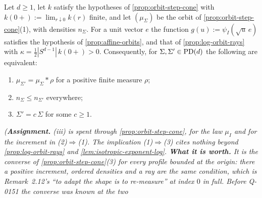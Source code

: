 \begin{proposition}
\label{prop:bounded-profile-rays}
\leanok
Let $d \ge 1$, let $k$ satisfy the hypotheses of \ref{prop:orbit-step-cone} with
$k(0{+}) := \lim_{r\downarrow0}k(r)$ finite, and let $(\mu_\Sigma)$ be the orbit of
\ref{prop:orbit-step-cone}(1), with \Levy{} densities $n_\Sigma$. For a unit vector $e$ the function
$g(u) := \psi_I(\sqrt u\,e)$ satisfies the hypothesis of \ref{prop:affine-orbits}, and that of
\ref{prop:log-orbit-rays} with $\kappa = \tfrac12|S^{d-1}|\,k(0{+}) > 0$. Consequently, for
$\Sigma, \Sigma' \in \mathrm{PD}(d)$ the following are equivalent:
\begin{enumerate}
\item $\mu_{\Sigma'} = \mu_\Sigma * \rho$ for a positive finite measure $\rho$;
\item $n_\Sigma \le n_{\Sigma'}$ everywhere;
\item $\Sigma' = c\,\Sigma$ for some $c \ge 1$.
\end{enumerate}
\statusA\quad{}\quad\emph{(\textbf{Assignment.} (iii) is spent through
\ref{prop:orbit-step-cone}, for the law $\mu_I$ and for the increment in (2)$\Rightarrow$(1). The
implication (1)$\Rightarrow$(3) cites nothing beyond \ref{prop:log-orbit-rays} and
\ref{lem:isotropic-exponent-log}. \textbf{What it is worth.} It is the converse of
\ref{prop:orbit-step-cone}(3) for every profile bounded at the origin: there a positive increment,
ordered \Levy{} densities and a ray are the same condition, which is Remark~2.12's ``to adapt the
shape is to re-measure'' at index $0$ in full. Before Q-0151 the converse was known at the two
}
\end{proposition}
